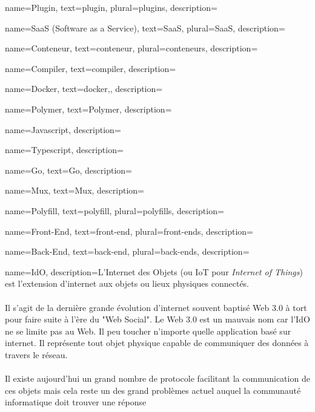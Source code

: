 \makeglossaries

{
    name=Plugin,
    text=plugin,
    plural=plugins,
    description={}
}

{
    name=SaaS (Software as a Service),
    text=SaaS,
    plural=SaaS,
    description={}
}

{
    name=Conteneur,
    text=conteneur,
    plural=conteneurs,
    description={}
}

{
    name=Compiler,
    text=compiler,
    description={}
}


{
    name=Docker,
    text=docker,,
    description={}
}

{
    name=Polymer,
    text=Polymer,
    description={}
}

{
    name=Javascript,
    description={}
}

{
    name=Typescript,
    description={}
}

{
    name=Go,
    text=Go,
    description={}
}

{
    name=Mux,
    text=Mux,
    description={}
}

{
    name=Polyfill,
    text=polyfill,
    plural=polyfills,
    description={}
}

{
    name=Front-End,
    text=front-end,
    plural=front-ends,
    description={}
}

{
    name=Back-End,
    text=back-end,
    plural=back-ends,
    description={}
}

{
    name=IdO,
    description={L'Internet des Objets (ou IoT pour \textit{Internet of Things}) est l'extension d'internet aux objets ou lieux physiques connectés.\\\\
    Il s'agit de la dernière grande évolution d'internet souvent baptisé Web 3.0 à tort pour faire suite à l'ère du "Web Social". Le Web 3.0 est un mauvais nom car l'IdO ne se limite pas au Web. Il peu toucher n'importe quelle application basé sur internet. Il représente tout objet physique capable de communiquer des données à travers le réseau. \\\\
    Il existe aujourd'hui un grand nombre de protocole facilitant la communication de ces objets mais cela reste un des grand problèmes actuel auquel la communauté informatique doit trouver une réponse}
}

